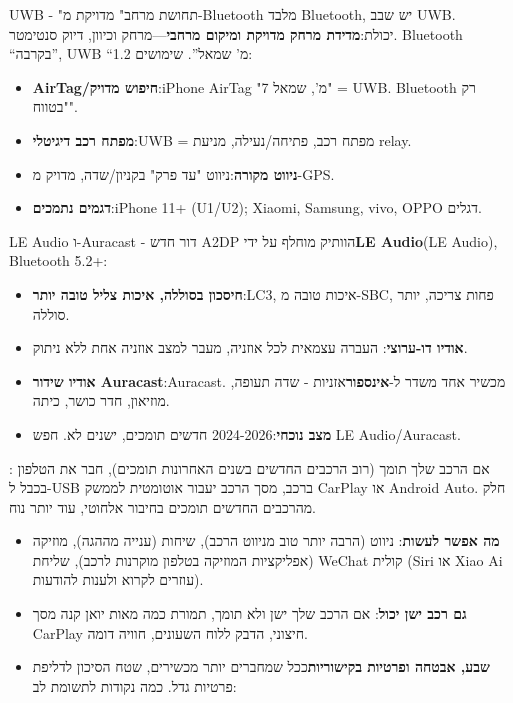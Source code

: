 \begin{tcbinfo}{UWB - "תחושת מרחב" מדויקת מ-Bluetooth}
מלבד Bluetooth, יש שבב UWB. יכולת:\textbf{מדידת מרחק מדויקת ומיקום מרחבי}—מרחק וכיוון, דיוק סנטימטר. Bluetooth “בקרבה”, UWB “1.2 מ' שמאל”. שימושים:

\begin{itemize}
  \item \textbf{AirTag/חיפוש מדויק}:iPhone AirTag "7 מ', שמאל" = UWB. Bluetooth רק "בטווח".
  \item \textbf{מפתח רכב דיגיטלי}:UWB = מפתח רכב, פתיחה/נעילה, מניעת relay.
  \item \textbf{ניווט מקורה}:ניווט "עד פרק" בקניון/שדה, מדויק מ-GPS.
  \item \textbf{דגמים נתמכים}:iPhone 11+ (U1/U2); Xiaomi, Samsung, vivo, OPPO דגלים.
\end{itemize}

\end{tcbinfo}

\begin{tcbinfo}{LE Audio ו-Auracast - דור חדש}
A2DP הוותיק מוחלף על ידי\textbf{LE Audio}(LE Audio), Bluetooth 5.2+:

\begin{itemize}
  \item \textbf{חיסכון בסוללה, איכות צליל טובה יותר}:LC3, איכות טובה מ-SBC, פחות צריכה, יותר סוללה.
  \item \textbf{אודיו דו-ערוצי}: העברה עצמאית לכל אוזניה, מעבר למצב אוזניה אחת ללא ניתוק.
  \item \textbf{אודיו שידור Auracast}:Auracast. מכשיר אחד משדר ל-\textbf{אינספור}אזניות - שדה תעופה, מוזיאון, חדר כושר, כיתה.
  \item \textbf{מצב נוכחי}:2024-2026 חדשים תומכים, ישנים לא. חפש LE Audio/Auracast.
\end{itemize}

\end{tcbinfo}


: אם הרכב שלך תומך (רוב הרכבים החדשים בשנים האחרונות תומכים), חבר את הטלפון בכבל ל-USB ברכב, מסך הרכב יעבור אוטומטית לממשק CarPlay או Android Auto. חלק מהרכבים החדשים תומכים בחיבור אלחוטי, עוד יותר נוח.

\begin{itemize}
  \item \textbf{מה אפשר לעשות}: ניווט (הרבה יותר טוב מניווט הרכב), שיחות (ענייה מההגה), מוזיקה (אפליקציות המוזיקה בטלפון מוקרנות לרכב), שליחת WeChat קולית (Siri או Xiao Ai עוזרים לקרוא ולענות להודעות).
  \item \textbf{גם רכב ישן יכול}: אם הרכב שלך ישן ולא תומך, תמורת כמה מאות יואן קנה מסך CarPlay חיצוני, הדבק ללוח השעונים, חוויה דומה.
  \item \textbf{שבע, אבטחה ופרטיות בקישוריות}ככל שמחברים יותר מכשירים, שטח הסיכון לדליפת פרטיות גדל. כמה נקודות לתשומת לב:
\end{itemize}

